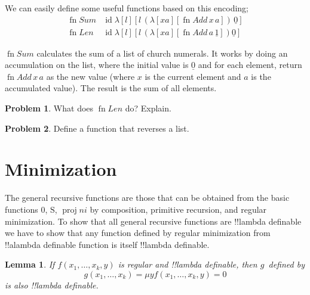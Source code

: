 \documentclass[10pt,a4paper]{article}
\theoremstyle{plain}
\newtheorem{lem}[thm]{Lemma}
\theoremstyle{definition}
\newtheorem{prob}{Problem}[section]
\theoremstyle{remark}
\newcommand*{\olfileid}[3]{}
\newcommand*{\olsection}[1]{\section*{#1}}
\newcommand*{\ollabel}[1]{\label{#1}}
\providecommand{\num}[1]{\underline{#1}}
\providecommand{\Zero}{\ensuremath{0}}
\providecommand{\Succ}{\ensuremath{\mathrm{S}}}
\providecommand{\lambd}{\ensuremath{\lambda}}
\providecommand{\Proj}{\operatorname{proj}}
\providecommand{\umin}{\mu}
\providecommand{\ident}{\operatorname{id}}
\providecommand{\fn}{\operatorname{fn}}
\providecommand{\fn}{\operatorname{fn}}
\begin{document}
We can easily define some useful functions based on this encoding; 
\begin{align*}
  \fn{Sum} & \ident
  \lambd[l][l \, (\lambd[xa][\fn{Add} \, x \, a])\,  \num{0}]\\
  \fn{Len} & \ident
  \lambd[l][l \, (\lambd[xa][\fn{Add} \, a \, \num{1}]) \num{0}]
\end{align*}

$\fn{Sum}$ calculates the sum of a list of church numerals. It works
by doing an accumulation on the list, where the initial value is
$\num{0}$ and for each element, return $\fn{Add} \, x\, a$ as the new
value (where $x$ is the current element and $a$ is the accumulated
value). The result is the sum of all elements.

\begin{prob}
  What does $\fn{Len}$ do? Explain.
\end{prob}

\begin{prob}
  Define a function that reverses a list.
\end{prob}





\olfileid{lam}{ldf}{min}
\olsection{Minimization}

The general recursive functions are those that can be obtained from
the basic functions $\Zero$, $\Succ$, $\Proj{n}{i}$ by composition,
primitive recursion, and regular minimization. To show that all
general recursive functions are !!{lambda definable} we have to show
that any function defined by regular minimization from !!a{lambda
  definable} function is itself !!{lambda definable}.

\begin{lem}
  \ollabel{lem:min} If $f(x_1, \dots, x_k, y)$ is regular and
  !!{lambda definable}, then $g$~defined by
  \[
  g(x_1, \dots, x_k) = \umin{y}{f(x_1,\dots,x_k, y) = 0}
  \]
  is also !!{lambda definable}.
\end{lem}
\end{document}
